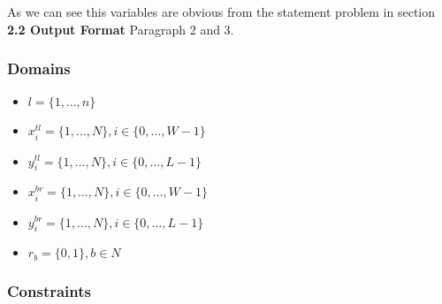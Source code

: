 \documentclass[12pt, a4paper]{article}
\begin{document}
As we can see this variables are obvious from the statement problem in section \textbf{2.2 Output Format} Paragraph 2 and 3.

\subsubsection{Domains}
\begin{itemize}
  \item $l = \{1,\dots,n\}$
  \item $x_i^{tl} = \{1, \dots, N\}, i \in \{0,\dots,W-1\}$
  \item $y_i^{tl} = \{1, \dots, N\}, i \in \{0,\dots,L-1\}$
  \item $x_i^{br} = \{1, \dots, N\}, i \in \{0,\dots,W-1\}$
  \item $y_i^{br} = \{1, \dots, N\}, i \in \{0,\dots,L-1\}$
  \item $r_b = \{0,1\}, b \in N$
\end{itemize}


\subsubsection{Constraints}
\end{document}
